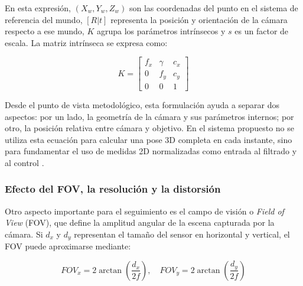 En esta expresión, $(X_w, Y_w, Z_w)$ son las coordenadas del punto en el sistema de referencia del mundo, $[R|t]$ representa la posición y orientación de la cámara respecto a ese mundo, $K$ agrupa los parámetros intrínsecos y $s$ es un factor de escala. La matriz intrínseca se expresa como:

\vspace{0.3cm}

\begin{equation}
K = \left[\begin{array}{ccc}
f_x & \gamma & c_x \\
0 & f_y & c_y \\
0 & 0 & 1
\end{array}\right]
\end{equation}

\vspace{0.3cm}

Desde el punto de vista metodológico, esta formulación ayuda a separar dos aspectos: por un lado, la geometría de la cámara y sus parámetros internos; por otro, la posición relativa entre cámara y objetivo. En el sistema propuesto no se utiliza esta ecuación para calcular una pose 3D completa en cada instante, sino para fundamentar el uso de medidas 2D normalizadas como entrada al filtrado y al control \cite{CameraModels, uvaPinholeCamera}.

\vspace{0.3cm}

\subsubsection{Efecto del FOV, la resolución y la distorsión}

\vspace{0.3cm}

Otro aspecto importante para el seguimiento es el campo de visión o \textit{Field of View} (FOV), que define la amplitud angular de la escena capturada por la cámara. Si $d_x$ y $d_y$ representan el tamaño del sensor en horizontal y vertical, el FOV puede aproximarse mediante:

\vspace{0.3cm}

\begin{equation}
FOV_x = 2 \arctan \left( \frac{d_x}{2f} \right), \quad FOV_y = 2 \arctan \left( \frac{d_y}{2f} \right)
\end{equation}

\vspace{0.3cm}


